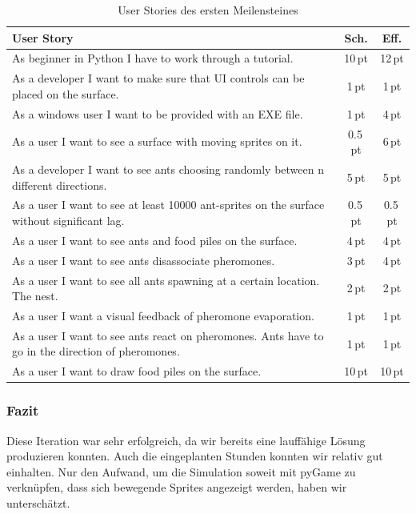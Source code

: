 \begin{table}[H]
\small\sffamily\renewcommand{\arraystretch}{1.5}
\begin{tabular}{| p{12cm} | c | c |}
  \hline
  \bfseries{User Story} & \bfseries{Sch.} & \bfseries{Eff.}  \\
  \hline
  As beginner in Python I have to work through a tutorial. & 10\,pt & 12\,pt \\
  \hline
  As a developer I want to make sure that UI controls can be placed on the
surface. & 1\,pt &1\,pt \\
  \hline
  As a windows user I want to be provided with an EXE file. & 1\,pt &4\,pt \\
  \hline
  As a user I want to see a surface with moving sprites on it. & 0.5\,pt & 6\,pt
\\
  \hline
  As a developer I want to see ants choosing randomly between n different
directions. & 5\,pt & 5\,pt \\
  \hline
  As a user I want to see at least 10000 ant-sprites on the surface without
significant lag. & 0.5\,pt & 0.5\,pt \\
  \hline
  As a user I want to see ants and food piles on the surface. & 4\,pt & 4\,pt \\
  \hline
  As a user I want to see ants disassociate pheromones. & 3\,pt & 4\,pt \\
  \hline
  As a user I want to see all ants spawning at a certain location. The nest. &
2\,pt & 2\,pt \\
  \hline
  As a user I want a visual feedback of pheromone evaporation. & 1\,pt & 1\,pt
\\
  \hline
  As a user I want to see ants react on pheromones. Ants have to go in the
direction of pheromones. & 1\,pt & 1\,pt \\
  \hline
  As a user I want to draw food piles on the surface. & 10\,pt & 10\,pt \\
  \hline
\end{tabular}
\captionsetup{type=table} %
\caption{User Stories des ersten Meilensteines}
\end{table}



\subsubsection*{Fazit}

Diese Iteration war sehr erfolgreich, da wir bereits eine lauffähige Lösung produzieren
konnten. Auch die eingeplanten Stunden konnten wir relativ gut einhalten. Nur den
Aufwand, um die Simulation soweit mit pyGame zu verknüpfen, dass sich bewegende Sprites
angezeigt werden, haben wir unterschätzt.

